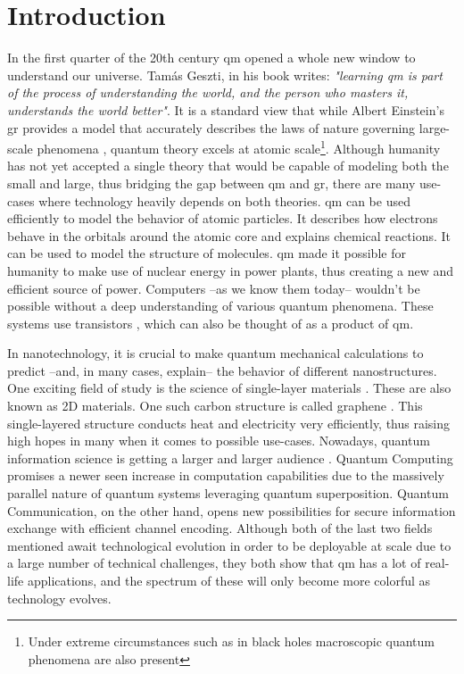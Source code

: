 \section{Introduction}

In the first quarter of the 20th century \acrfull{qm} opened a whole new window to understand our universe. Tamás Geszti, in his book \cite{geszti2007} writes: \textit{"learning \acrshort{qm} is part of the process of understanding the world, and the person who masters it, understands the world better"}.
It is a standard view that while Albert Einstein's \acrfull{gr} provides a model that accurately describes the laws of nature governing large-scale phenomena \cite{wald2010general}, quantum theory excels at atomic scale\footnote{Under extreme circumstances such as in black holes macroscopic quantum phenomena are also present}.
Although humanity has not yet accepted a single theory that would be capable of modeling both the small and large, thus bridging the gap between \acrshort{qm} and \acrshort{gr}, there are many use-cases where technology heavily depends on both theories.
\acrshort{qm} can be used efficiently to model the behavior of atomic particles.
It describes how electrons behave in the orbitals around the atomic core and explains chemical reactions.
It can be used to model the structure of molecules.
\acrshort{qm} made it possible for humanity to make use of nuclear energy in power plants, thus creating a new and efficient source of power.
Computers --as we know them today-- wouldn't be possible without a deep understanding of various quantum phenomena.
These systems use transistors \cite{Ross1998}, which can also be thought of as a product of \acrshort{qm}.

In nanotechnology, it is crucial to make quantum mechanical calculations to predict --and, in many cases, explain-- the behavior of different nanostructures.
One exciting field of study is the science of single-layer materials \cite{Zhuang2014}. These are also known as 2D materials.
One such carbon structure is called graphene \cite{Geim2009, Stoller2008, B815239J}.
This single-layered structure conducts heat and electricity very efficiently, thus raising high hopes in many when it comes to possible use-cases.
Nowadays, quantum information science is getting a larger and larger audience \cite{imresandor2004}.
Quantum Computing promises a newer seen increase in computation capabilities due to the massively parallel nature of quantum systems leveraging quantum superposition. Quantum Communication, on the other hand, opens new possibilities for secure information exchange with efficient channel encoding.
Although both of the last two fields mentioned await technological evolution in order to be deployable at scale due to a large number of technical challenges, they both show that \acrshort{qm} has a lot of real-life applications, and the spectrum of these will only become more colorful as technology evolves.


